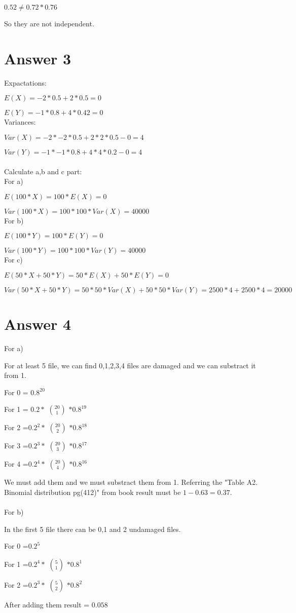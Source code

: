 \documentclass[12pt]{article}
\begin{document}
$0.52 \neq 0.72 * 0.76$

So they are not independent.


\section*{Answer 3}


Expactations:

$E(X) =  -2 * 0.5 + 2 * 0.5 = 0$

$E(Y) =  -1 * 0.8 + 4 * 0.42 = 0$
\\
Variances:

$Var(X) =  -2 * -2 * 0.5 + 2 * 2 * 0.5 - 0 = 4$

$Var(Y) =  -1 * -1 * 0.8 + 4 * 4 * 0.2 - 0 = 4$
\\\\
Calculate a,b and c part:\\
For a)

$E(100 * X) = 100 * E(X) = 0$

$Var(100 * X) = 100 * 100 * Var(X) = 40000$
\\
For b)

$E(100 * Y) = 100 * E(Y) = 0$

$Var(100 * Y) = 100 * 100 * Var(Y) = 40000$
\\
For c)

$E(50 * X + 50 * Y) = 50 * E(X) + 50 * E(Y) = 0$

$Var(50 * X + 50 * Y) = 50 * 50 * Var(X) + 50 * 50 * Var(Y) = 2500 * 4 + 2500 * 4 = 20000$

\section*{Answer 4}


For a)


For at least 5 file, we can find 0,1,2,3,4 files are damaged and we can substract it from 1.

For 0 = $0.8^{20}$

For 1 = $0.2 *$ ${20}\choose{1}$ $* 0.8^{19}$

For 2 =$0.2^{2} *$ ${20}\choose{2}$ $*0.8^{18}$

For 3 =$0.2^{3} *$ ${20}\choose{3}$ $*0.8^{17}$

For 4 =$0.2^{4} *$ ${20}\choose{4}$ $*0.8^{16}$

We must add them and we must substract them from 1. Referring the "Table A2. Binomial distribution pg(412)" from book result must be $1 - 0.63 = 0.37$.
\\
\\
For b)

In the first 5 file there can be 0,1 and 2 undamaged files.

For 0 =$0.2^{5}$

For 1 =$0.2^{4} *$ ${5}\choose{1}$ $*0.8^{1}$

For 2 =$0.2^{3} *$ ${5}\choose{2}$ $*0.8^{2}$

After adding them result = $0.058$
\end{document}
